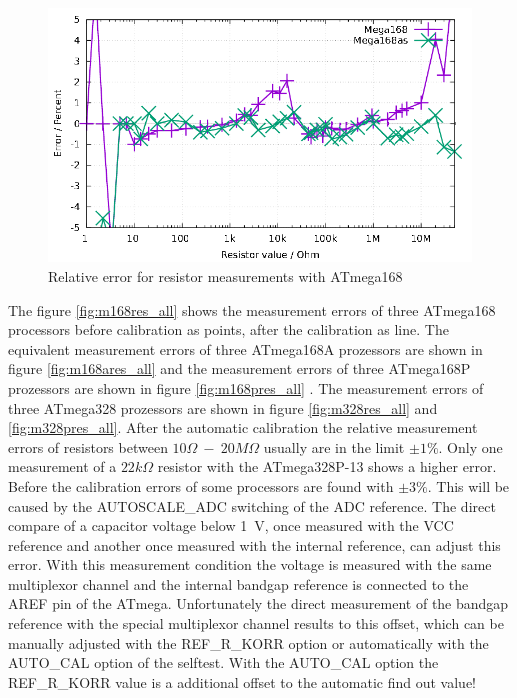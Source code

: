 \begin{figure}[H]
\centering
\includegraphics[width=16cm]{../GNU/Mega168res.pdf}
\caption{Relative error for resistor measurements with ATmega168 }
\label{fig:mega168res}
\end{figure}

The figure \ref{fig:m168res_all} shows the measurement errors of three ATmega168 processors before calibration as points, after the
calibration as line. The equivalent measurement errors of three ATmega168A prozessors are shown in figure \ref{fig:m168ares_all} and
the measurement errors of three ATmega168P prozessors are shown in figure \ref{fig:m168pres_all} .
The measurement errors of three ATmega328 prozessors are shown in figure \ref{fig:m328res_all} and \ref{fig:m328pres_all}.
After the automatic calibration the relative measurement errors of resistors between \(10\Omega~-~20 M\Omega\) 
usually are in the limit \(\pm1\%\). Only one measurement of a \(22k\Omega\) resistor with the ATmega328P-13 shows 
a higher error.
Before the calibration errors of some processors are found with \(\pm3\%\).
This will be caused by the AUTOSCALE\_ADC switching of the ADC reference.
The direct compare of a capacitor voltage below 1~V, once measured with the VCC reference and another once measured with 
the internal reference, can adjust this error.
With this measurement condition the voltage is measured with the same multiplexor channel and the internal bandgap reference
is connected to the AREF pin of the ATmega.
Unfortunately the direct measurement of the bandgap reference with the special multiplexor channel results to this offset,
which can be manually adjusted with the REF\_R\_KORR option or automatically with the AUTO\_CAL option of the selftest.
With the AUTO\_CAL option the REF\_R\_KORR value is a additional offset to the automatic find out value!

